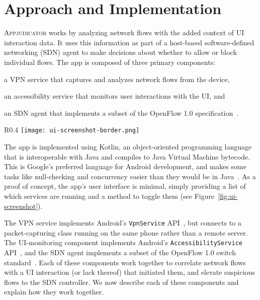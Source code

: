 \section{Approach and Implementation}
\label{sec:implementation}

\textsc{Appjudicator} works by analyzing network flows with the added context of
UI interaction data. It uses this information as part of a host-based
software-defined networking (SDN) agent to make decisions about whether to allow
or block individual flows. The app is composed of three primary components:
\begin{enumerate*}[label=(\arabic*)]
	\item a VPN service that captures and analyzes network flows from the
		device,
	\item an accessibility service that monitors user interactions with the
		UI, and
	\item an SDN agent that implements a subset of the OpenFlow 1.0
		specification~\cite{openflowspec}.
\end{enumerate*}

\begin{wrapfigure}{R}{0.4\textwidth}
	\centering
	\texttt{[image: ui-screenshot-border.png]}
	\caption{A screenshot of \textsc{Appjudicator}'s user interface (vertical
		whitespace truncated for brevity).}
	\label{fig:ui-screenshot}
\end{wrapfigure}


The app is implemented using Kotlin, an object-oriented programming language
that is interoperable with Java and compiles to Java Virtual Machine bytecode.
This is Google's preferred language for Android development, and makes some
tasks like null-checking and concurrency easier than they would be in
Java~\cite{lardinois2019}. As a proof of concept, the app's user interface is
minimal, simply providing a list of which services are running and a method to
toggle them (see Figure~\ref{fig:ui-screenshot}).

The VPN service implements Android's \texttt{VpnService}
API~\cite{googledevelopers2020vpn}, but connects to a packet-capturing class
running on the same phone rather than a remote server. The UI-monitoring
component implements Android's \texttt{AccessibilityService}
API~\cite{googledevelopers2020}, and the SDN agent implements a subset of the
OpenFlow 1.0 switch standard~\cite{mckeown2008}. Each of these components work
together to correlate network flows with a UI interaction (or lack thereof) that
initiated them, and elevate suspicious flows to the SDN controller. We now
describe each of these components and explain how they work together.

